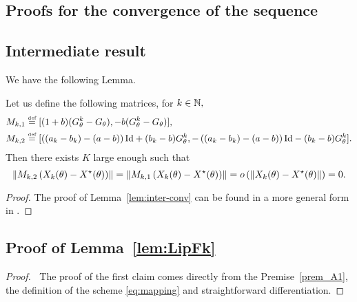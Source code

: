 	\begin{appendices}
\section{Proofs for the convergence of the sequence}\label{sec:pr-conv-seq}

\subsection{Intermediate result}\label{sec:int-conv}
We have the following Lemma.
\begin{lemma}\label{lem:inter-conv} Let us define the following matrices, for $k\in\mathbb{N},$ 
\begin{align*}
&M_{k,1}\stackrel{\text{\rm\tiny def}}{=}[(1+b)(G^k_{\theta}-G_{\theta}),-b(G^k_{\theta}-G_{\theta})],\\
&M_{k,2}\stackrel{\text{\rm\tiny def}}{=}[\left({(a_{k}-b_{k})-(a-b)}\right)\mathrm{Id}+(b_{k}-b)G^k_{\theta},-\left({(a_{k}-b_{k})-(a-b)}\right)\mathrm{Id}-(b_{k}-b)G^k_{\theta}]. 
\end{align*}
Then there exists $K$ large enough such that
\[
\left\Vert {M_{k,2}\left({X_{k}(\theta)-X^{\star}(\theta)}\right)} \right\Vert=\left\Vert {M_{k,1}\left({X_{k}(\theta)-X^{\star}(\theta)}\right)} \right\Vert=o\left({\left\Vert {X_{k}(\theta)-X^{\star}(\theta)} \right\Vert}\right)=0.
\]
\end{lemma}
\begin{proof} The proof of Lemma~\ref{lem:inter-conv}  can be found in a more general form in \cite[Proposition~27]{liang_activity_2017}.
\end{proof}
\subsection{Proof of Lemma~\ref{lem:LipFk}}\label{prf:lem:LipFk}
\begin{proof}$~$ 
The proof of the first claim comes directly from the Premise~\ref{prem_A1}, the definition of the scheme \eqref{eq:mapping} and straightforward differentiation.


\end{proof}
\end{appendices}

